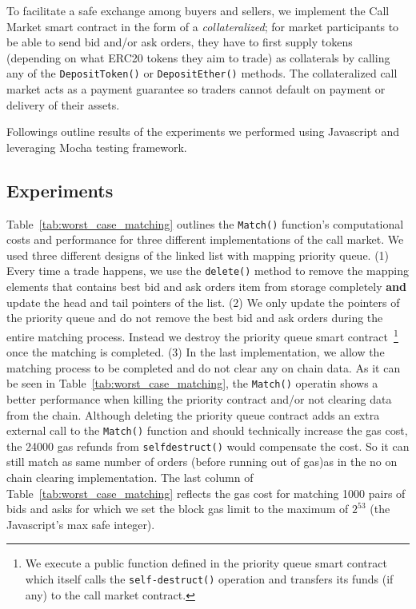 

To facilitate a safe exchange among buyers and sellers, we implement the Call Market smart contract in the form of a \textit{collateralized}; for market participants to be able to send bid and/or ask orders, they have to first supply tokens (depending on what ERC20 tokens they aim to trade) as collaterals by calling any of the  \texttt{DepositToken()} or \texttt{DepositEther()} methods. The collateralized call market acts as a payment guarantee so traders cannot default on payment or delivery of their assets. 

Followings outline results of the experiments we performed using Javascript and leveraging Mocha testing framework.
 

 \subsection{Experiments}



Table~\ref{tab:worst_case_matching} outlines the \texttt{Match()} function's computational costs and performance for three different implementations of the call market. We used three different designs of the linked list with mapping priority queue. (1) Every time a trade happens, we use the \texttt{delete()} method to remove the mapping elements that contains best bid and ask orders item from storage completely \textbf{and} update the head and tail pointers of the list. (2) We only update the pointers of the priority queue and do not remove the best bid and ask orders during the entire matching process. Instead we destroy the priority queue smart contract~\footnote{We execute a public function defined in the priority queue smart contract which itself calls the \texttt{self-destruct()} operation and transfers its funds (if any) to the call market contract.} once the matching is completed. (3) In the last implementation, we allow the matching process to be completed and do not clear any on chain data. As it can be seen in Table~\ref{tab:worst_case_matching}, the \texttt{Match()} operatin shows a better performance when killing the priority contract and/or not clearing data from the chain. Although deleting the priority queue contract adds an extra external call to the \texttt{Match()} function and should technically increase the gas cost, the 24000 gas refunds from \texttt{selfdestruct()} would compensate the cost. So it can still match as same number of orders (before running out of gas)as in the no on chain clearing implementation. The last column of Table~\ref{tab:worst_case_matching} reflects the gas cost for matching 1000 pairs of bids and asks for which we set the block gas limit to the maximum of  $2^{53}$ (the Javascript's max safe integer).

